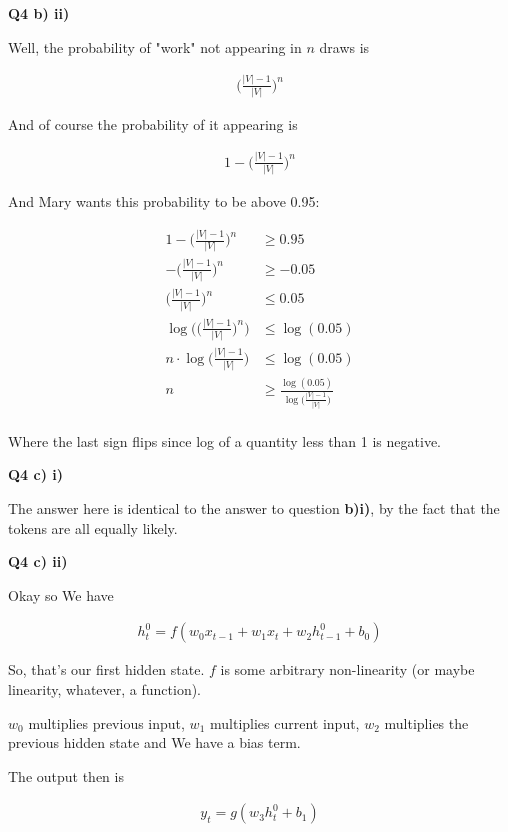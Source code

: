 \documentclass{article}
\begin{document}
\textbf{Q4 b) ii)}

	Well, the probability of "work" not appearing in $n$ draws is
	
	\begin{align}
		\bigg( \frac{|V|-1}{|V|}\bigg)^n
	\end{align}
	
	And of course the probability of it appearing is
	
	\begin{align}
		1 - \bigg( \frac{|V|-1}{|V|}\bigg)^n
	\end{align}
	
	And Mary wants this probability to be above 0.95:

	\begin{align}
		1 - \bigg( \frac{|V|-1}{|V|}\bigg)^n &\ge 0.95\\
		- \bigg( \frac{|V|-1}{|V|}\bigg)^n &\ge -0.05\\
		\bigg( \frac{|V|-1}{|V|}\bigg)^n &\le 0.05\\
		\log\bigg(\bigg( \frac{|V|-1}{|V|}\bigg)^n\bigg) &\le \log(0.05)\\
		n\cdot\log\bigg( \frac{|V|-1}{|V|}\bigg) &\le \log(0.05)\\
		n &\ge \frac{\log(0.05)}{\log\big( \frac{|V|-1}{|V|}\big)}\\
	\end{align}
	
	Where the last sign flips since log of a quantity less than 1 is negative. 

\textbf{Q4 c) i)}

	The answer here is identical to the answer to question \textbf{b)i)}, by the fact that the tokens are all equally likely.
	
	
\textbf{Q4 c) ii)}

	Okay so We have
	
	\begin{align}
		h^0_t = f(w_0x_{t-1} + w_1 x_t + w_2h^0_{t-1} + b_0)
	\end{align}
	
	So, that's our first hidden state. $f$ is some arbitrary non-linearity (or maybe linearity, whatever, a function).
	
	$w_0$ multiplies previous input, $w_1$ multiplies current input, $w_2$ multiplies the previous hidden state and We have a bias term. 
	
	The output then is
	
	\begin{align}
		y_t = g(w_3h^0_t + b_1)
	\end{align}
	
\end{document}
